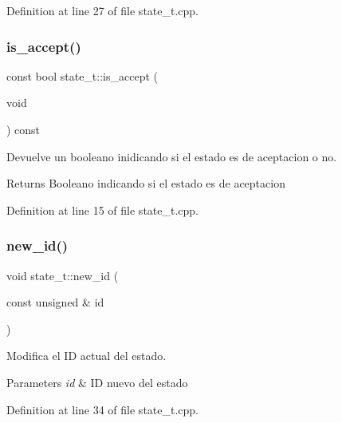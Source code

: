 Definition at line 27 of file state\+\_\+t.\+cpp.

\mbox{\label{classstate__t_a83874dc98292ca29be83680dee6f9456}} 
\subsubsection{\texorpdfstring{is\+\_\+accept()}{is\_accept()}}
{\footnotesize\ttfamily const bool state\+\_\+t\+::is\+\_\+accept (\begin{DoxyParamCaption}\item[{void}]{ }\end{DoxyParamCaption}) const}



Devuelve un booleano inidicando si el estado es de aceptacion o no. 

\begin{DoxyReturn}{Returns}
Booleano indicando si el estado es de aceptacion 
\end{DoxyReturn}


Definition at line 15 of file state\+\_\+t.\+cpp.

\mbox{\label{classstate__t_a541e80fbf886c337d53c0e5614f0c38b}} 
\subsubsection{\texorpdfstring{new\+\_\+id()}{new\_id()}}
{\footnotesize\ttfamily void state\+\_\+t\+::new\+\_\+id (\begin{DoxyParamCaption}\item[{const unsigned \&}]{id }\end{DoxyParamCaption})}



Modifica el ID actual del estado. 


\begin{DoxyParams}{Parameters}
{\em id} & ID nuevo del estado \\
\hline
\end{DoxyParams}


Definition at line 34 of file state\+\_\+t.\+cpp.

\mbox{\label{classstate__t_aef60c051e68f523c809033f2e9bdd202}} 
